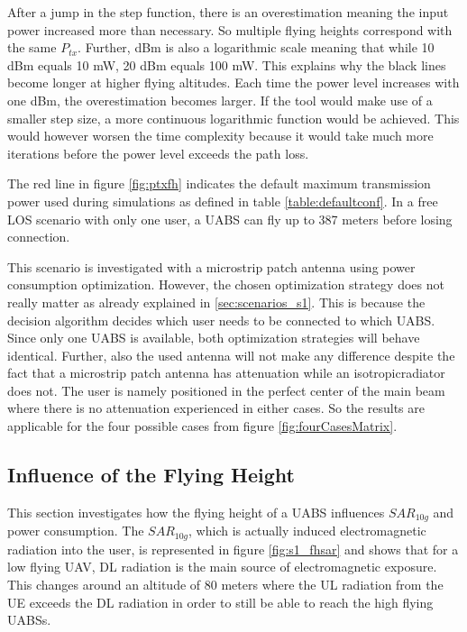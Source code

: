 After a jump in the step function, there is an overestimation meaning the input power increased more than necessary. So multiple flying heights correspond with the same $P_{tx}$.
Further, dBm is also a logarithmic scale meaning that while 10 dBm equals 10 mW, 20 dBm equals 100 mW. This explains why the black lines become longer at higher flying altitudes.
Each time the power level increases with one dBm, the overestimation becomes larger. If the tool would make use of a smaller step size, a more continuous 
logarithmic function would be achieved. This would however worsen the time complexity because it would take much more iterations before 
the power level exceeds the path loss. 

The red line in figure \ref{fig:ptxfh} indicates the default maximum transmission power used during simulations as 
defined in table \ref{table:defaultconf}. 
In a free \gls{LOS} scenario with only one user, a \gls{UABS} can fly up to 387 meters before losing connection.

This scenario is investigated with a microstrip patch antenna using power consumption optimization. 
 However, the chosen optimization strategy does not really matter as already explained in  \ref{sec:scenarios_s1}. This is because the decision 
 algorithm decides which user 
needs to be connected to which \gls{UABS}. Since only one \gls{UABS} is available, both optimization strategies will behave identical.
Further, also the used antenna will not make any difference
despite the fact that a microstrip patch antenna has attenuation while an \gls{isotropicradiator} does not.
The user is namely positioned in the perfect center of the main beam where there is 
no attenuation experienced in either cases. So the results are applicable for the four possible cases from figure \ref{fig:fourCasesMatrix}.

\FloatBarrier
\subsection{Influence of the Flying Height}
\label{sub:senario1_influenceOfFlyHeight}

This section investigates how the flying height of a \gls{UABS} influences $SAR_{10g}$ and power consumption.
The $SAR_{10g}$, which is actually induced electromagnetic radiation into the user, is represented in figure \ref{fig:s1_fhsar}
and shows that for a low flying \gls{UAV}, \gls{DL} radiation is the main source of electromagnetic exposure.
This changes around an altitude of 80 meters where the \gls{UL} radiation from the \gls{UE}
exceeds the \gls{DL} radiation in order to still be able to reach the high flying \gls{UABS}s.

